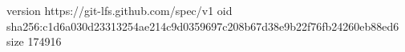 version https://git-lfs.github.com/spec/v1
oid sha256:c1d6a030d23313254ae214c9d0359697c208b67d38e9b22f76fb24260eb88ed6
size 174916
